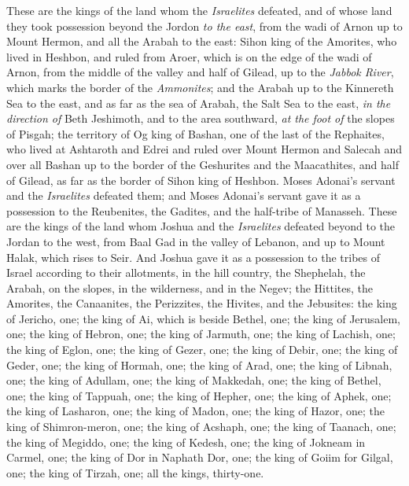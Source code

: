 \begin{biblechapter} %
 These are the kings of the land whom the \textit{Israelites} defeated, and of whose land they took possession beyond the Jordon \textit{to the east}, from the wadi of Arnon up to Mount Hermon, and all the Arabah to the east:
\verse Sihon king of the Amorites, who lived in Heshbon, and ruled from Aroer, which is on the edge of the wadi of Arnon, from the middle of the valley and half of Gilead, up to the \textit{Jabbok River}, which marks the border of the \textit{Ammonites};
\verse and the Arabah up to the Kinnereth Sea to the east, and as far as the sea of Arabah, the Salt Sea to the east, \textit{in the direction of} Beth Jeshimoth, and to the area southward, \textit{at the foot of} the slopes of Pisgah;
\verse the territory of Og king of Bashan, one of the last of the Rephaites, who lived at Ashtaroth and Edrei
\verse and ruled over Mount Hermon and Salecah and over all Bashan up to the border of the Geshurites and the Maacathites, and half of Gilead, as far as the border of Sihon king of Heshbon.
\verse Moses Adonai’s servant and the \textit{Israelites} defeated them; and Moses Adonai’s servant gave it as a possession to the Reubenites, the Gadites, and the half-tribe of Manasseh.
 These are the kings of the land whom Joshua and the \textit{Israelites} defeated beyond to the Jordan to the west, from Baal Gad in the valley of Lebanon, and up to Mount Halak, which rises to Seir. And Joshua gave it as a possession to the tribes of Israel according to their allotments,
\verse in the hill country, the Shephelah, the Arabah, on the slopes, in the wilderness, and in the Negev; the Hittites, the Amorites, the Canaanites, the Perizzites, the Hivites, and the Jebusites:
\verse the king of Jericho, one; the king of Ai, which is beside Bethel, one;
\verse the king of Jerusalem, one; the king of Hebron, one;
\verse the king of Jarmuth, one; the king of Lachish, one;
\verse the king of Eglon, one; the king of Gezer, one;
\verse the king of Debir, one; the king of Geder, one;
\verse the king of Hormah, one; the king of Arad, one;
\verse the king of Libnah, one; the king of Adullam, one;
\verse the king of Makkedah, one; the king of Bethel, one;
\verse the king of Tappuah, one; the king of Hepher, one;
\verse the king of Aphek, one; the king of Lasharon, one;
\verse the king of Madon, one; the king of Hazor, one;
\verse the king of Shimron-meron, one; the king of Acshaph, one;
\verse the king of Taanach, one; the king of Megiddo, one;
\verse the king of Kedesh, one; the king of Jokneam in Carmel, one;
\verse the king of Dor in Naphath Dor, one; the king of Goiim for Gilgal, one;
\verse the king of Tirzah, one; all the kings, thirty-one.
\end{biblechapter}

